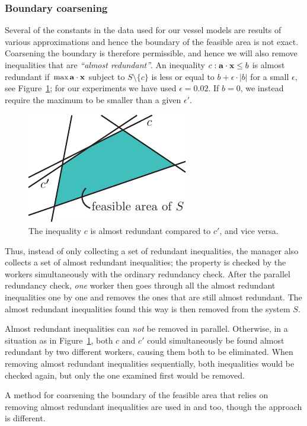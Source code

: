 \subsubsection{Boundary coarsening} 
Several of the constants in the data used for our vessel models are results of various approximations and hence the boundary of the feasible area is not exact. Coarsening the boundary is therefore permissible, and hence we will also remove inequalities that are \emph{``almost redundant''}. An inequality $c: \mathbf{a}\cdot\mathbf{x}\leq b$ is almost redundant if $\max \mathbf{a}\cdot\mathbf{x}$  subject to $S\setminus\{c\}$ is less or equal to $b + \epsilon\cdot |b|$ for a small $\epsilon$, see Figure~\ref{fig:almostRedundant}; for our experiments we have used $\epsilon = 0.02$. If $b=0$, we instead require the maximum to be smaller than a given $\epsilon'$. 

\begin{figure}[htbp]
	\centering
		\includegraphics[scale=0.9]{figures/almostRedundant.pdf}
	\caption{The inequality $c$ is almost redundant compared to $c'$, and vice versa.}
	\label{fig:almostRedundant}
\end{figure}

Thus, instead of only collecting a set of redundant inequalities, the manager also collects a set of almost redundant inequalities; the property is checked by the workers simultaneously with the ordinary redundancy check. After the parallel redundancy check, \emph{one} worker then goes through all the almost redundant inequalities one by one and removes the ones that are still almost redundant. The almost redundant inequalities found this way is then removed from the system $S$.  

Almost redundant inequalities can \emph{not} be removed in parallel. Otherwise, in a situation as in Figure~\ref{fig:almostRedundant}, both $c$ and $c'$ could simultaneously be found almost redundant by two different workers, causing them both to be eliminated. When removing almost redundant inequalities sequentially, both inequalities would be checked again, but only the one examined first would be removed.

A method for coarsening the boundary of the feasible area that relies on removing almost redundant inequalities are used in \cite{lukatskii08} and \cite{shapot12} too, though the approach is different.


%
%